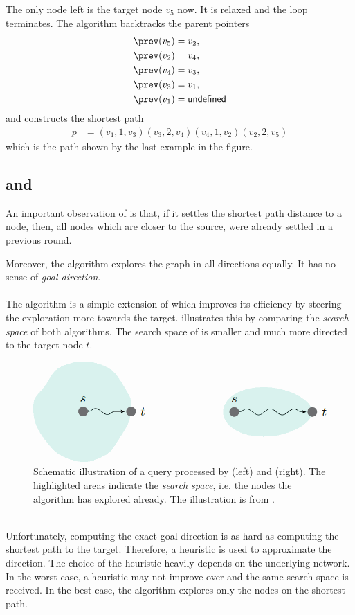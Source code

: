 	The only node left is the target node $v_5$ now. It is relaxed and the loop terminates.
	The algorithm backtracks the parent pointers
	\begin{align*}
		\prev(v_5)	&= v_2,\\
		\prev(v_2)	&= v_4,\\
		\prev(v_4)	&= v_3,\\
		\prev(v_3)	&= v_1,\\
		\prev(v_1)	&= \vundef
	\end{align*}
	and constructs the shortest path
	\begin{align*}
		p	&= (v_1, 1, v_3)(v_3, 2, v_4)(v_4, 1, v_2)(v_2, 2, v_5)
	\end{align*}
	which is the path shown by the last example in the figure.

\subsection{\astar and \alt}\label{alt}
	An important observation of \dijkstra is that, if it settles the shortest path distance to a node, then,
	all nodes which are closer to the source, were already settled in a previous round.
	
	Moreover, the algorithm explores the graph in all directions equally. It has no sense of \textit{goal direction}.\\\\
	The \astar algorithm  is a simple extension of \dijkstra which improves its efficiency by steering the
	exploration more towards the target.  illustrates this by comparing the \textit{search space}
	of both algorithms. The search space of \astar is smaller and much more directed to the target node $t$.
	\begin{figure}[!ht]
		 \begin{center}
			\includegraphics[scale=0.5]{res/dijkstra_vs_astar}
		\end{center}
		\caption{Schematic illustration of a query processed by \dijkstra (left) and \astar (right).
			The highlighted areas indicate the \textit{search space}, i.e. the nodes the algorithm has explored already.
			The illustration is from .}
		\label{dijkstra_vs_astar}
	\end{figure}\quad\\
	Unfortunately, computing the exact goal direction is as hard as computing the shortest path to the target.
	Therefore, a heuristic is used to approximate the direction. The choice of the heuristic heavily depends on the underlying network.
	In the worst case, a heuristic may not improve over \dijkstra and the same search space is received. In the best case,
	the algorithm explores only the nodes on the shortest path.
	

